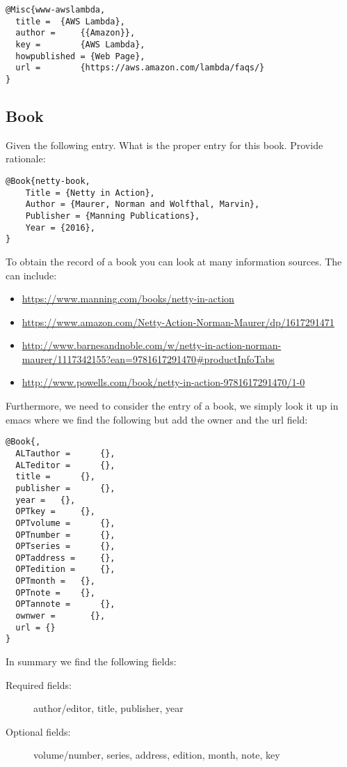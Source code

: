 \begin{verbatim}
@Misc{www-awslambda,
  title =  {AWS Lambda},
  author =     {{Amazon}},
  key =        {AWS Lambda},
  howpublished = {Web Page},
  url =        {https://aws.amazon.com/lambda/faqs/}
}
\end{verbatim}

\subsection{Book}\label{book}

Given the following entry. What is the proper entry for this book.
Provide rationale:

\begin{verbatim}
@Book{netty-book,
    Title = {Netty in Action},
    Author = {Maurer, Norman and Wolfthal, Marvin},
    Publisher = {Manning Publications},
    Year = {2016},
}
\end{verbatim}

To obtain the record of a book you can look at many information sources.
The can include:

\begin{itemize}
\tightlist
\item
  \url{https://www.manning.com/books/netty-in-action}
\item
  \url{https://www.amazon.com/Netty-Action-Norman-Maurer/dp/1617291471}
\item
  \url{http://www.barnesandnoble.com/w/netty-in-action-norman-maurer/1117342155?ean=9781617291470\#productInfoTabs}
\item
  \url{http://www.powells.com/book/netty-in-action-9781617291470/1-0}
\end{itemize}

Furthermore, we need to consider the entry of a book, we simply look it
up in emacs where we find the following but add the owner and the url
field:

\begin{verbatim}
@Book{,
  ALTauthor =      {},
  ALTeditor =      {},
  title =      {},
  publisher =      {},
  year =   {},
  OPTkey =     {},
  OPTvolume =      {},
  OPTnumber =      {},
  OPTseries =      {},
  OPTaddress =     {},
  OPTedition =     {},
  OPTmonth =   {},
  OPTnote =    {},
  OPTannote =      {},
  ownwer =       {},
  url = {}
}
\end{verbatim}

In summary we find the following fields:

\begin{description}
\item[Required fields:]
author/editor, title, publisher, year
\item[Optional fields:]
volume/number, series, address, edition, month, note, key
\end{description}


